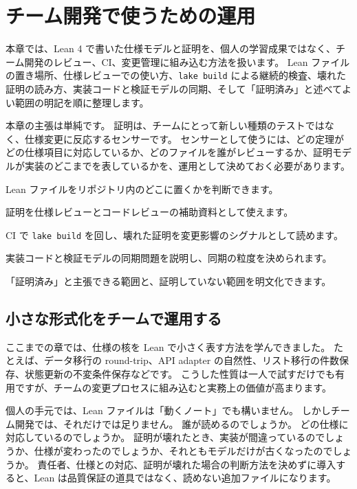 \chapter{チーム開発で使うための運用}
\label{chap:team-operations}

\begin{chapterabstract}
本章では、Lean 4 で書いた仕様モデルと証明を、個人の学習成果ではなく、チーム開発のレビュー、CI、変更管理に組み込む方法を扱います。
Lean ファイルの置き場所、仕様レビューでの使い方、\texttt{lake build} による継続的検査、壊れた証明の読み方、実装コードと検証モデルの同期、そして「証明済み」と述べてよい範囲の明記を順に整理します。

本章の主張は単純です。
証明は、チームにとって新しい種類のテストではなく、仕様変更に反応するセンサーです。
センサーとして使うには、どの定理がどの仕様項目に対応しているか、どのファイルを誰がレビューするか、証明モデルが実装のどこまでを表しているかを、運用として決めておく必要があります。
\end{chapterabstract}

\begin{learninggoals}
\item Lean ファイルをリポジトリ内のどこに置くかを判断できます。
\item 証明を仕様レビューとコードレビューの補助資料として使えます。
\item CI で \texttt{lake build} を回し、壊れた証明を変更影響のシグナルとして読めます。
\item 実装コードと検証モデルの同期問題を説明し、同期の粒度を決められます。
\item 「証明済み」と主張できる範囲と、証明していない範囲を明文化できます。
\end{learninggoals}

\section{小さな形式化をチームで運用する}

ここまでの章では、仕様の核を Lean で小さく表す方法を学んできました。
たとえば、データ移行の round-trip、API adapter の自然性、リスト移行の件数保存、状態更新の不変条件保存などです。
こうした性質は一人で試すだけでも有用ですが、チームの変更プロセスに組み込むと実務上の価値が高まります。

個人の手元では、Lean ファイルは「動くノート」でも構いません。
しかしチーム開発では、それだけでは足りません。
誰が読めるのでしょうか。
どの仕様に対応しているのでしょうか。
証明が壊れたとき、実装が間違っているのでしょうか、仕様が変わったのでしょうか、それともモデルだけが古くなったのでしょうか。
責任者、仕様との対応、証明が壊れた場合の判断方法を決めずに導入すると、Lean は品質保証の道具ではなく、読めない追加ファイルになります。

